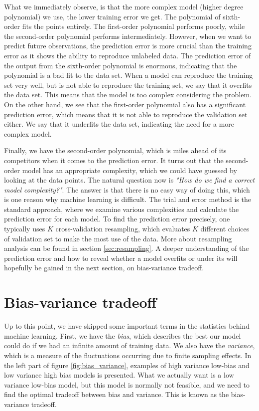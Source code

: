 What we immediately observe, is that the more complex model (higher degree polynomial) we use, the lower training error we get. The polynomial of sixth-order fits the points entirely. The first-order polynomial performs poorly, while the second-order polynomial performs intermediately. However, when we want to predict future observations, the prediction error is more crucial than the training error as it shows the ability to reproduce unlabeled data. The prediction error of the output from the sixth-order polynomial is enormous, indicating that the polynomial is a bad fit to the data set. When a model can reproduce the training set very well, but is not able to reproduce the training set, we say that it overfits the data set. This means that the model is too complex considering the problem. On the other hand, we see that the first-order polynomial also has a significant prediction error, which means that it is not able to reproduce the validation set either. We say that it underfits the data set, indicating the need for a more complex model.

Finally, we have the second-order polynomial, which is miles ahead of its competitors when it comes to the prediction error. It turns out that the second-order model has an appropriate complexity, which we could have guessed by looking at the data points. The natural question now is \textit{"How do we find a correct model complexity?"}. The answer is that there is no easy way of doing this, which is one reason why machine learning is difficult. The trial and error method is the standard approach, where we examine various complexities and calculate the prediction error for each model. To find the prediction error precisely, one typically uses $K$ cross-validation resampling, which evaluates $K$ different choices of validation set to make the most use of the data. More about resampling analysis can be found in section \ref{sec:resampling}. A deeper understanding of the prediction error and how to reveal whether a model overfits or under its will hopefully be gained in the next section, on bias-variance tradeoff. 

\section{Bias-variance tradeoff}
Up to this point, we have skipped some important terms in the statistics behind machine learning. First, we have the \textit{bias}, which describes the best our model could do if we had an infinite amount of training data. We also have the \textit{variance}, which is a measure of the fluctuations occurring due to finite sampling effects. In the left part of figure \eqref{fig:bias_variance}, examples of high variance low-bias and low variance high bias models is presented. What we actually want is a low variance low-bias model, but this model is normally not feasible, and we need to find the optimal tradeoff between bias and variance. This is known as the bias-variance tradeoff. 

